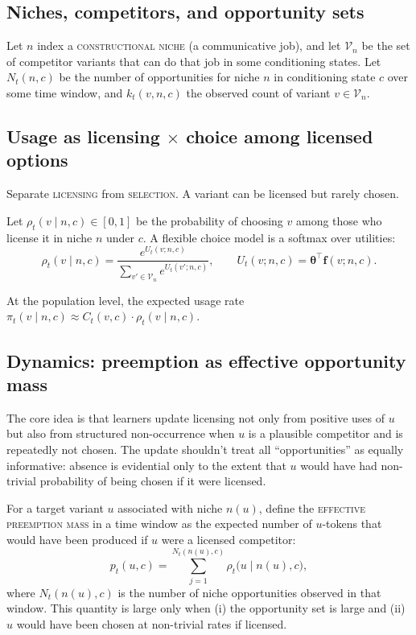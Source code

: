 \documentclass[12pt,letterpaper]{article}
\newcommand{\term}[1]{\textsc{#1}}
\begin{document}
\subsection{Niches, competitors, and opportunity sets}
\label{sec:niches}

Let $n$ index a \term{constructional niche} (a communicative job), and let
$\mathcal{V}_{n}$ be the set of competitor variants that can do that job
in some conditioning states.
Let $N_t(n,c)$ be the number of opportunities for niche $n$ in conditioning state $c$
over some time window, and $k_t(v,n,c)$ the observed count of variant $v\in\mathcal{V}_n$.

\subsection{Usage as \texorpdfstring{licensing $\times$ choice}{licensing x choice} among licensed options}
\label{sec:usage}

Separate \term{licensing} from \term{selection}.  A variant can be licensed but rarely chosen.

Let $\rho_t(v\mid n,c)\in[0,1]$ be the probability of choosing $v$ among those who license it
in niche $n$ under $c$.  A flexible choice model is a softmax over utilities:
$$
\rho_t(v\mid n,c)=\frac{e^{U_t(v;n,c)}}{\sum_{v'\in\mathcal{V}_n}e^{U_t(v';n,c)}},
\qquad
U_t(v;n,c)=\boldsymbol{\theta}^{\top}\mathbf{f}(v;n,c).
$$

At the population level, the expected usage rate $\pi_t(v\mid n,c)\approx C_t(v,c)\cdot \rho_t(v\mid n,c)$.



\subsection{Dynamics: preemption as effective opportunity mass}
\label{sec:update}

The core idea is that
learners update licensing not only from positive uses of $u$ but also from
structured non-occurrence when $u$ is a plausible competitor and is repeatedly
not chosen. The update shouldn't treat all \enquote{opportunities} as equally
informative: absence is evidential only to the extent that $u$ would have had
non-trivial probability of being chosen if it were licensed.

For a target variant $u$ associated with niche $n(u)$, define the \term{effective
preemption mass} in a time window as the expected number of $u$-tokens that would
have been produced if $u$ were a licensed competitor:
\begin{equation*}
p_t(u,c)
=\sum_{j=1}^{N_t(n(u),c)}
\rho_t\!\bigl(u\mid n(u),c\bigr),
\end{equation*}
where $N_t(n(u),c)$ is the number of niche opportunities observed in that window.
This quantity is large only when (i) the opportunity set is large and (ii) $u$
would have been chosen at non-trivial rates if licensed.
\end{document}
